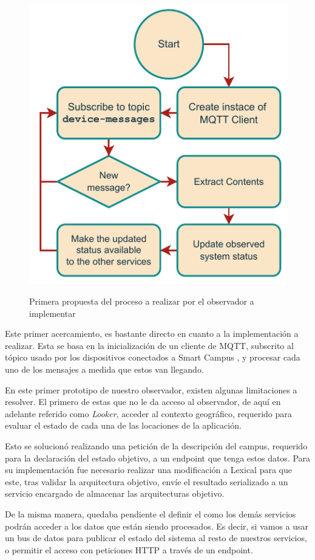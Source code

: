\begin{figure}[H]
    \caption{Primera propuesta del proceso a realizar \linebreak por el observador a implementar} 
    \centering
    \includegraphics[width=0.6\linewidth]{images/LookerProcess.pdf}
    \label{fig:proceso_looker}
\end{figure}

Este primer acercamiento, es bastante directo en cuanto a la implementación a realizar. Esta se basa en la inicialización de un cliente de MQTT, subscrito al tópico usado por los dispositivos conectados a Smart Campus \cite{SmartCampusGithub}, y procesar cada uno de los mensajes a medida que estos van llegando.



En este primer prototipo de nuestro observador, existen algunas limitaciones a resolver. El primero de estas que no le da acceso al observador, de aquí en adelante referido como \textit{Looker}, acceder al contexto geográfico, requerido para evaluar el estado de cada una de las locaciones de la aplicación. 

Esto se solucionó realizando una petición de la descripción del campus, requerido para la declaración del estado objetivo, a un endpoint que tenga estos datos. Para su implementación fue necesario realizar una modificación a Lexical para que este, tras validar la arquitectura objetivo, envíe el resultado serializado a un servicio encargado de almacenar las arquitecturas objetivo. 

De la misma manera, quedaba pendiente el definir el como los demás servicios podrán acceder a los datos que están siendo procesados. Es decir, si vamos a usar un bus de datos para publicar el estado del sistema al resto de nuestros servicios, o permitir el acceso con peticiones HTTP a través de un endpoint.


